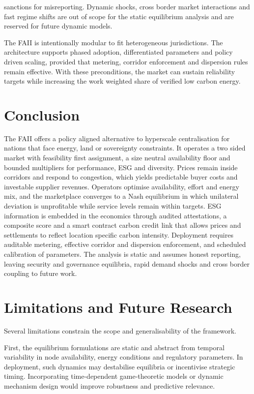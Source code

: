 \documentclass[oneside,10pt]{swissi}
\begin{document}
sanctions for misreporting. Dynamic shocks, cross border market interactions and fast regime shifts are out of scope for the static equilibrium analysis and are reserved for future dynamic models.

The FAII is intentionally modular to fit heterogeneous jurisdictions. The architecture supports phased adoption, differentiated parameters and policy driven scaling, provided that metering, corridor enforcement and dispersion rules remain effective. With these preconditions, the market can sustain reliability targets while increasing the work weighted share of verified low carbon energy.\\

\section{Conclusion}

The FAII offers a policy aligned alternative to hyperscale centralisation for nations that face energy, land or sovereignty constraints. It operates a two sided market with feasibility first assignment, a size neutral availability floor and bounded multipliers for performance, ESG and diversity. Prices remain inside corridors and respond to congestion, which yields predictable buyer costs and investable supplier revenues. Operators optimise availability, effort and energy mix, and the marketplace converges to a Nash equilibrium in which unilateral deviation is unprofitable while service levels remain within targets. ESG information is embedded in the economics through audited attestations, a composite score and a smart contract carbon credit link that allows prices and settlements to reflect location specific carbon intensity. Deployment requires auditable metering, effective corridor and dispersion enforcement, and scheduled calibration of parameters. The analysis is static and assumes honest reporting, leaving security and governance equilibria, rapid demand shocks and cross border coupling to future work.\\

\section{Limitations and Future Research}
Several limitations constrain the scope and generalisability of the framework.

First, the equilibrium formulations are static and abstract from temporal variability in node availability, energy conditions and regulatory parameters. In deployment, such dynamics may destabilise equilibria or incentivise strategic timing. Incorporating time-dependent game-theoretic models or dynamic mechanism design would improve robustness and predictive relevance.
\end{document}
